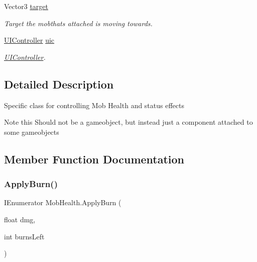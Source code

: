 \begin{DoxyCompactItemize}
\mbox{\label{class_mob_health_ade867811ed397c0701ffa21a446e92ac}} 
Vector3 \hyperlink{class_mob_health_ade867811ed397c0701ffa21a446e92ac}{target}
\begin{DoxyCompactList}\small\item\em Target the mobthat\textquotesingle{}s attached is moving towards. \end{DoxyCompactList}\item 
\mbox{\label{class_mob_health_a4e2637916ef423d557a89d0d7d50cb8f}} 
\hyperlink{class_u_i_controller}{U\+I\+Controller} \hyperlink{class_mob_health_a4e2637916ef423d557a89d0d7d50cb8f}{uic}
\begin{DoxyCompactList}\small\item\em \hyperlink{class_u_i_controller}{U\+I\+Controller}. \end{DoxyCompactList}\end{DoxyCompactItemize}


\subsection{Detailed Description}
Specific class for controlling Mob Health and status effects \begin{DoxyNote}{Note}
this Should not be a gameobject, but instead just a component attached to some gameobjects 
\end{DoxyNote}


\subsection{Member Function Documentation}
\mbox{\label{class_mob_health_a90c10dc6ba571545b3d466ec83ebf6e7}} 
\subsubsection{\texorpdfstring{Apply\+Burn()}{ApplyBurn()}}
{\footnotesize\ttfamily I\+Enumerator Mob\+Health.\+Apply\+Burn (\begin{DoxyParamCaption}\item[{float}]{dmg,  }\item[{int}]{burns\+Left }\end{DoxyParamCaption})}

